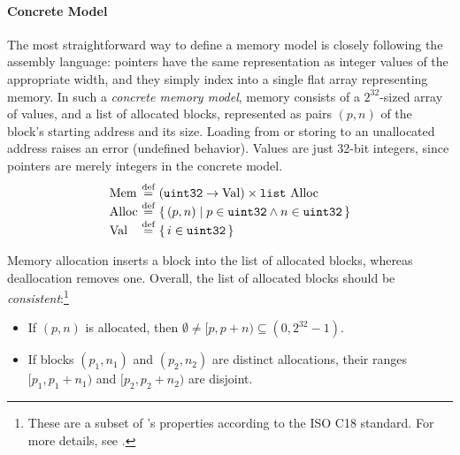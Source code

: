 


\paragraph{Concrete Model}

The most straightforward way to define a memory model is closely following the assembly language:
pointers have the same representation as integer values of the appropriate width, and they simply
index into a single flat array representing memory.  In such a \emph{concrete memory model}, memory
consists of a $2^{32}$-sized array of values, and a list of allocated blocks, represented as pairs
$(p,n)$ of the block's starting address and its size.  Loading from or storing to an unallocated
address raises an error (\ie undefined behavior).  Values are just 32-bit integers, since pointers
are merely integers in the concrete model.
\[
\begin{array}{@{}l@{~}c@{~}l@{}}
\mathrm{Mem} &\defeq& (\usize \to \rtlVal) \times \mathtt{list}\ \mathrm{Alloc} \\
\mathrm{Alloc} &\defeq& \setof{(p,n) \suchthat p \in \usize \land n \in \usize} \\
\rtlVal &\defeq& \setof{i\in\usize}
\end{array}
\]

Memory allocation inserts a block into the list of allocated blocks, whereas deallocation removes
one.  Overall, the list of allocated blocks should be \emph{consistent}:\footnote{These are a subset
  of 's properties according to the ISO C18 standard.  For more details, see
  \cite[\S7.22.3p1 and \S6.5.8p5]{c18}.}
\begin{itemize}
\item If $(p, n)$ is allocated, then $\emptyset \neq [p,p+n) \subseteq
  (0,2^{32}-1)$.
\item If blocks $(p_1, n_1)$ and $(p_2, n_2)$ are distinct
  allocations, their ranges $[p_1,p_1+n_1)$ and $[p_2,p_2+n_2)$
  are disjoint.
\end{itemize}

